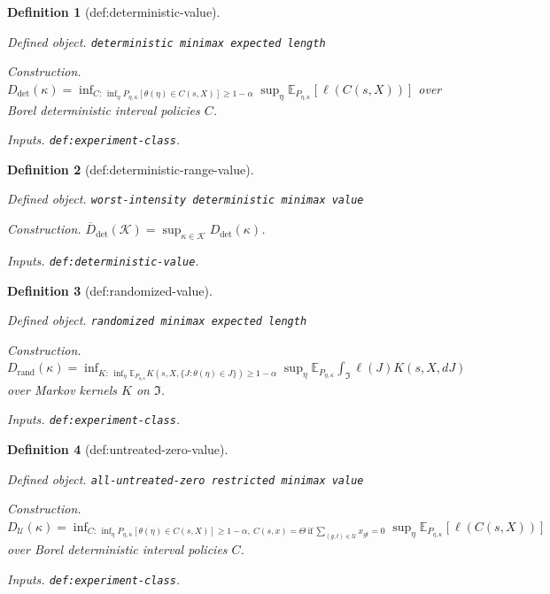 \documentclass{article}
\newtheorem{definition}{Definition}
\begin{document}
\begin{definition}[def:deterministic-value]\label{def:deterministic-value}
\par\smallskip\noindent\emph{Defined object.} \texttt{deterministic minimax expected length}
\par\smallskip\noindent\emph{Construction.} \(D_{\mathrm{det}}(\kappa)=\inf_{C:\,\inf_{\eta}P_{\eta,\kappa}[\theta(\eta)\in C(s,X)]\ge1-\alpha}\sup_{\eta}\mathbb E_{P_{\eta,\kappa}}[\ell(C(s,X))]\) over Borel deterministic interval policies \(C\).
\par\smallskip\noindent\emph{Inputs.} \texttt{def:\allowbreak{}experiment-\allowbreak{}class}.
\end{definition}

\begin{definition}[def:deterministic-range-value]\label{def:deterministic-range-value}
\par\smallskip\noindent\emph{Defined object.} \texttt{worst-\allowbreak{}intensity deterministic minimax value}
\par\smallskip\noindent\emph{Construction.} \(\overline D_{\mathrm{det}}(\mathcal K)=\sup_{\kappa\in\mathcal K}D_{\mathrm{det}}(\kappa)\).
\par\smallskip\noindent\emph{Inputs.} \texttt{def:\allowbreak{}deterministic-\allowbreak{}value}.
\end{definition}

\begin{definition}[def:randomized-value]\label{def:randomized-value}
\par\smallskip\noindent\emph{Defined object.} \texttt{randomized minimax expected length}
\par\smallskip\noindent\emph{Construction.} \(D_{\mathrm{rand}}(\kappa)=\inf_{K:\,\inf_{\eta}\mathbb E_{P_{\eta,\kappa}}K(s,X,\{J:\theta(\eta)\in J\})\ge1-\alpha}\sup_{\eta}\mathbb E_{P_{\eta,\kappa}}\int_{\mathfrak I}\ell(J)K(s,X,dJ)\) over Markov kernels \(K\) on \(\mathfrak I\).
\par\smallskip\noindent\emph{Inputs.} \texttt{def:\allowbreak{}experiment-\allowbreak{}class}.
\end{definition}

\begin{definition}[def:untreated-zero-value]\label{def:untreated-zero-value}
\par\smallskip\noindent\emph{Defined object.} \texttt{all-\allowbreak{}untreated-\allowbreak{}zero restricted minimax value}
\par\smallskip\noindent\emph{Construction.} \(D_{\mathcal U}(\kappa)=\inf_{C:\,\inf_{\eta}P_{\eta,\kappa}[\theta(\eta)\in C(s,X)]\ge1-\alpha,\ C(s,x)=\Theta\ \mathrm{if}\ \sum_{(g,t)\in\mathcal U}x_{gt}=0}\sup_{\eta}\mathbb E_{P_{\eta,\kappa}}[\ell(C(s,X))]\) over Borel deterministic interval policies \(C\).
\par\smallskip\noindent\emph{Inputs.} \texttt{def:\allowbreak{}experiment-\allowbreak{}class}.
\end{definition}
\end{document}
